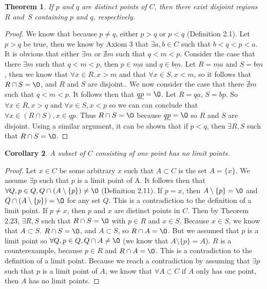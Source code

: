 \documentclass[12pt]{article}
\renewcommand{\emptyset}{\O}
\renewcommand{\_}[1]{\underline{ #1 }}
\newtheorem{theorem}{Theorem}[section]
\newtheorem{corollary}[theorem]{Corollary}
\theoremstyle{definition}
\numberwithin{equation}{subsection}
\begin{document}
\begin{theorem}  If $p$ and $q$ are distinct points of $C$, then there exist disjoint regions $R$ and~$S$ containing $p$ and $q$, respectively.
\end{theorem}
\begin{proof}
We know that because $p \not = q$, either $p > q$ or $p < q$ (Definition 2.1). Let $p > q$ be true, then we know by Axiom 3 that $\exists a,b \in C$ such that $b < q < p < a$. It is obvious that either $\exists m$ or $\nexists m$ such that $q < m < p$. Consider the case that there $\exists m$ such that $q < m < p$, then $p \in \underline{ma}$ and $q \in \underline {bm}$. Let $R = \underline{ma}$ and $S = \underline {bm}$, then we know that $\forall x \in R, x > m$ and that $\forall x \in S, x < m$, so it follows that $R \cap S = \emptyset$, and $R$ and $S$ are disjoint.. We now consider the case that there $\nexists m$ such that $q < m < p$. It follows then that $\underline{qp} = \emptyset$. Let $R = \underline{qa}$, $S = \underline {bp}$. So $\forall x \in R, x > q$ and $\forall x \in S, x < p$ so we can can conclude that $\forall x \in (R \cap S), x \in \underline{qp}$. Thus $R \cap S = \emptyset$ because $\underline{qp} = \emptyset$ so $R$ and $S$ are disjoint. Using a similar argument, it can be shown that if $p < q$, then $\exists R,S$ such that $R \cap S = \emptyset$.
\end{proof}
\begin{corollary}  A subset of $C$ consisting of one point has no limit points.
\end{corollary}
\begin{proof}
Let $x \in C$ be some arbitrary $x$ such that $A \subset C$ is the set $A = \{x\}$. We assume $\exists p$ such that $p$ is a limit point of A. It follows then that $\forall Q, p \in Q, Q \cap (A \setminus \{p\}) \not = \emptyset$ (Definition 2.11). If $p = x$, then $A \setminus \{p\} = \emptyset$ and $Q \cap (A \setminus \{p\}) = \emptyset$ for any set $Q$. This is a contradiction to the definition of a limit point. If $p \not = x$, then $p$ and $x$ are distinct points in $C$. Then by Theorem 2.23, $\exists R,S$ such that $R \cap S = \emptyset$ with $p \in R$ and $x \in S$. Because $x \in S$, we know that $A \subset S$. $R \cap S = \emptyset$, and $A \subset S$, so $R \cap A = \emptyset$. But we assumed that $p$ is a limit point so $\forall Q, p \in Q, Q \cap A \not = \emptyset$ (we know that $A \setminus \{p\} = A$). $R$ is a counterexample, because $p \in R$ and $R \cap A = \emptyset$. This is a contradiction to the definition of a limit point. Because we reach a contradiction by assuming that $\exists p$ such that $p$ is a limit point of $A$, we know that $\forall A \subset C$ if $A$ only has one point, then $A$ has no limit points.
\end{proof}
\end{document}
